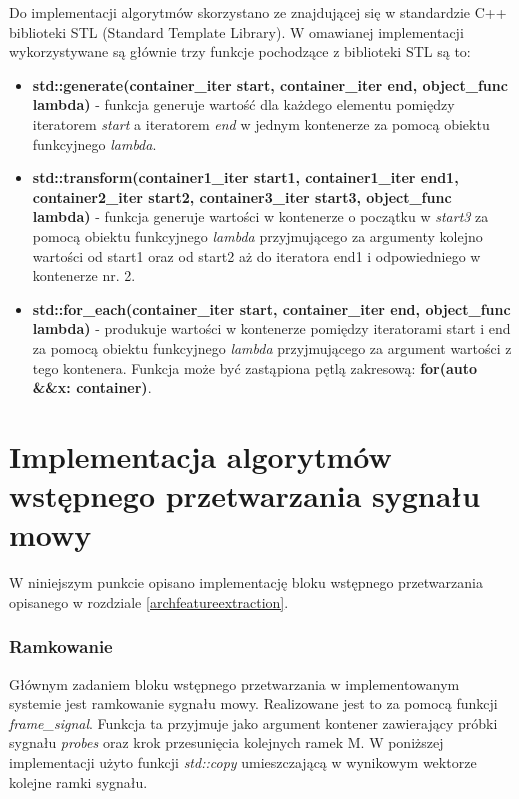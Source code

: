 Do implementacji algorytmów skorzystano ze znajdującej się w standardzie C++ biblioteki STL (Standard Template Library). W omawianej implementacji wykorzystywane są głównie trzy funkcje pochodzące z biblioteki STL są to:
\begin{itemize}
  \item{\textbf{std::generate(container\_iter start, container\_iter end, object\_func lambda)}} - funkcja generuje wartość dla każdego elementu pomiędzy iteratorem \textit{start} a iteratorem \textit{end} w jednym kontenerze za pomocą obiektu funkcyjnego \textit{lambda}.
  \item{\textbf{std::transform(container1\_iter start1, container1\_iter end1,
                       container2\_iter start2,
                       container3\_iter start3, object\_func lambda)}} 
  - funkcja generuje wartości w kontenerze o początku w \textit{start3} za pomocą obiektu funkcyjnego \textit{lambda} przyjmującego za argumenty kolejno wartości od start1 oraz od start2 aż do iteratora end1 i odpowiedniego w kontenerze nr. 2.
  \item{\textbf{std::for\_each(container\_iter start, container\_iter end, object\_func lambda)}} - produkuje wartości w kontenerze pomiędzy iteratorami start i end za pomocą obiektu funkcyjnego \textit{lambda} przyjmującego za argument wartości z tego kontenera. Funkcja może być zastąpiona pętlą zakresową: \textbf{for(auto \&\&x: container)}.

\end{itemize}

\section{Implementacja algorytmów wstępnego przetwarzania  sygnału mowy}

W niniejszym punkcie opisano implementację bloku wstępnego przetwarzania opisanego w rozdziale \ref{archfeatureextraction}.

\subsubsection{Ramkowanie}

Głównym zadaniem bloku wstępnego przetwarzania w implementowanym systemie jest ramkowanie sygnału mowy. Realizowane jest to za pomocą funkcji \textit{frame\_signal}. Funkcja ta przyjmuje jako argument kontener zawierający próbki sygnału \textit{probes} oraz krok przesunięcia kolejnych ramek M. W poniższej implementacji użyto funkcji \textit{std::copy} umieszczającą w wynikowym wektorze kolejne ramki sygnału.

